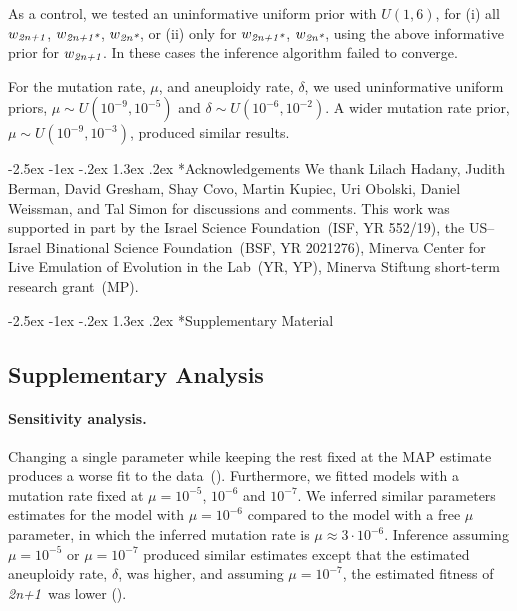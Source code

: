 \documentclass[12pt]{extarticle}
\makeatletter
\renewcommand\section{\@startsection {section}{1}{\z@}%
     {-2.5ex \@plus -1ex \@minus -.2ex}%
     {1.3ex \@plus.2ex}%
    {\Large\bfseries}}
\newcommand{\anwt}{\emph{2n+1}}
\newcommand{\eumt}{\emph{2n*}}
\newcommand{\anmt}{\emph{2n+1*}}
\newcommand{\beginsupplement}{%
      	\setcounter{table}{0}
        \renewcommand{\thetable}{S\arabic{table}}%
        \setcounter{figure}{0}
        \renewcommand{\thefigure}{S\arabic{figure}}%
}
\makeatother
\begin{document}
As a control, we tested an uninformative uniform prior with $\mathit{U}(1,6)$, for (i) all $w_{\anwt}$, $w_{\anmt}$, $w_{\eumt}$, or (ii) only for $w_{\anmt}$, $w_{\eumt}$, using the above informative prior for $w_{\anwt}$. In these cases the inference algorithm failed to converge.
 
For the mutation rate, $\mu$, and aneuploidy rate, $\delta$, we used uninformative uniform priors, $\mu \sim \mathit{U}(10^{-9},10^{-5})$ and $\delta \sim \mathit{U}(10^{-6},10^{-2})$. A wider mutation rate prior, $\mu \sim \mathit{U}(10^{-9},10^{-3})$, produced similar results.



{\small
\section*{Acknowledgements}
We thank Lilach Hadany, Judith Berman, David Gresham, Shay Covo, Martin Kupiec, Uri Obolski, Daniel Weissman, and Tal Simon for discussions and comments.
This work was supported in part by 
the Israel Science Foundation~(ISF, YR 552/19),
the US--Israel Binational Science Foundation~(BSF, YR 2021276),
Minerva Center for Live Emulation of Evolution in the Lab~(YR, YP),
Minerva Stiftung short-term research grant~(MP).
}




\newpage

\section*{Supplementary Material}
\beginsupplement %

\subsection*{Supplementary Analysis}
\label{sec:supp_analysis}

\paragraph{Sensitivity analysis.} 
Changing a single parameter while keeping the rest fixed at the MAP estimate produces a worse fit to the data~().
Furthermore, we fitted models with a mutation rate fixed at $\mu=10^{-5}$, $10^{-6}$ and $10^{-7}$.
We inferred similar parameters estimates for the model with $\mu=10^{-6}$ compared to the model with a free $\mu$ parameter, in which the inferred mutation rate is $\mu \approx 3\cdot10^{-6}$.
Inference assuming $\mu=10^{-5}$ or $\mu=10^{-7}$ produced similar estimates except that the estimated aneuploidy rate, $\delta$, was higher, and assuming $\mu=10^{-7}$, the estimated fitness of \anwt\ was lower ().
\end{document}
